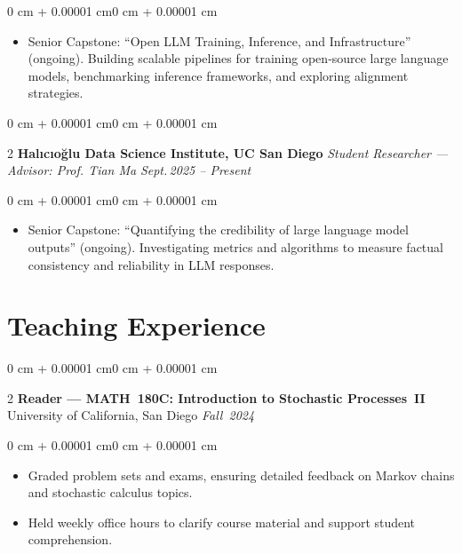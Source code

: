 \documentclass[10pt, letterpaper]{article}
\newenvironment{highlights}{\begin{itemize}[topsep=0.10 cm, parsep=0.10 cm, partopsep=0pt, itemsep=0pt, leftmargin=0 cm + 10pt]}{\end{itemize}}
\newenvironment{onecolentry}{\begin{adjustwidth}{0 cm + 0.00001 cm}{0 cm + 0.00001 cm}}{\end{adjustwidth}}
\newenvironment{twocolentry}[2][]{\onecolentry \def\secondColumn{#2} \setcolumnwidth{\fill, 4.5 cm} \begin{paracol}{2}}{\switchcolumn \raggedleft \secondColumn \end{paracol} \endonecolentry}
\begin{document}
    \vspace{0.10 cm}
    \begin{onecolentry}
        \begin{highlights}
            \item Senior Capstone: “Open LLM Training, Inference, and Infrastructure” (ongoing). Building scalable pipelines for training open‑source large language models, benchmarking inference frameworks, and exploring alignment strategies.
        \end{highlights}
    \end{onecolentry}

    \vspace{0.20 cm}

    \begin{twocolentry}{\textit{Sept.\,2025 -- Present}}
        \textbf{Halıcıo\u{g}lu Data Science Institute, UC San Diego}\newline
        \textit{Student Researcher — Advisor: Prof. Tian Ma}
    \end{twocolentry}

    \vspace{0.10 cm}
    \begin{onecolentry}
        \begin{highlights}
            \item Senior Capstone: “Quantifying the credibility of large language model outputs” (ongoing). Investigating metrics and algorithms to measure factual consistency and reliability in LLM responses.
        \end{highlights}
    \end{onecolentry}

    \section{Teaching Experience}

    \begin{twocolentry}{\textit{Fall 2024}}
        \textbf{Reader — MATH 180C: Introduction to Stochastic Processes II}\newline
        University of California, San Diego
    \end{twocolentry}

    \vspace{0.10 cm}
    \begin{onecolentry}
        \begin{highlights}
            \item Graded problem sets and exams, ensuring detailed feedback on Markov chains and stochastic calculus topics.
            \item Held weekly office hours to clarify course material and support student comprehension.
        \end{highlights}
    \end{onecolentry}
\end{document}
